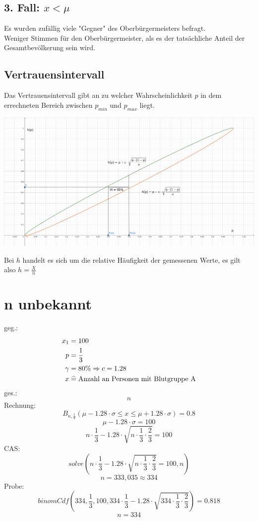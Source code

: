 \documentclass[a4paper,12pt]{article}
\newcommand\equalhat{\mathrel{\stackon[1.5pt]{=}{\stretchto{%
    \scalerel*[\widthof{=}]{\wedge}{\rule{1ex}{3ex}}}{0.5ex}}}}
\begin{document}
\subsection*{3. Fall: $x < \mu$}
Es wurden zufällig viele "Gegner" des Oberbürgermeisters befragt.\\
Weniger Stimmen für den Oberbürgermeister, als es der tatsächliche Anteil der Gesamtbevölkerung sein wird.\\
\subsection*{Vertrauensintervall}
Das Vertrauensintervall gibt an zu welcher Wahrscheinlichkeit $p$ in dem errechneten Bereich zwischen $p_{min}$ und $p_{max}$ liegt.
\begin{center}
\includegraphics[width=1.1\textwidth]{image4.png}
\end{center}
Bei $h$ handelt es sich um die relative Häufigkeit der gemessenen Werte, es gilt also $h = \frac{X}{n}$
\pagebreak
\section{n unbekannt}
geg.:
\begin{equation*}
\begin{split}
x_{1} & = 100\\
p & = \frac{1}{3}\\
\gamma & = 80\% \Rightarrow c = 1.28\\
x & \equalhat \text{Anzahl an Personen mit Blutgruppe A}
\end{split}
\end{equation*}
ges.:
$$n$$
Rechnung:\\
$$B_{n, \frac{1}{3}}(\mu - 1.28 \cdot \sigma \leq x \leq \mu + 1.28 \cdot \sigma) = 0.8$$
$$\mu - 1.28 \cdot \sigma = 100$$
$$n \cdot \frac{1}{3} - 1.28 \cdot \sqrt{n \cdot \frac{1}{3} \cdot \frac{2}{3}} = 100$$
CAS:\\
$$solve(n \cdot \frac{1}{3} - 1.28 \cdot \sqrt{n \cdot \frac{1}{3} \cdot \frac{2}{3}} = 100, n)$$
$$n = 333,035 \approx 334$$
Probe:\\
$$binomCdf(334,\frac{1}{3}, 100, 334 \cdot \frac{1}{3} - 1.28 \cdot \sqrt{334 \cdot \frac{1}{3} \cdot \frac{2}{3}}) = 0.818$$
$$n = 334$$
\pagebreak
\end{document}
